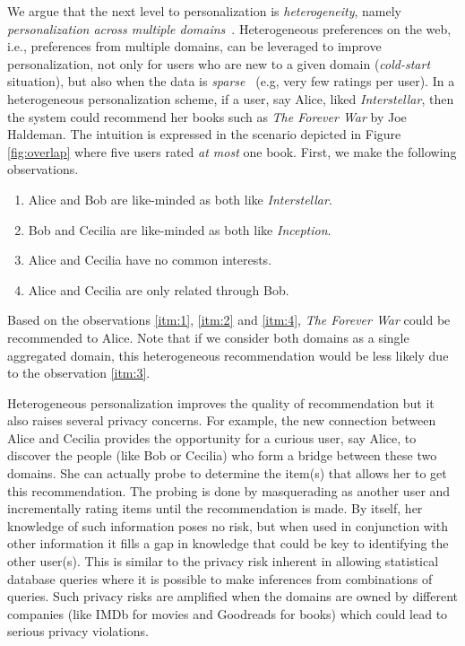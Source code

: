 We argue that the next level to personalization is \emph{heterogeneity}, namely \emph{personalization across multiple domains}~\cite{cremonesi2011cross}. Heterogeneous preferences on the web, i.e., preferences from multiple domains, can be leveraged to improve personalization, not only for users who are new to a given domain (\emph{cold-start} situation), but also when the data is \emph{sparse}~\cite{adomavicius2005toward} (e.g, very few ratings per user). In a heterogeneous personalization scheme, if a user, say Alice, liked \emph{Interstellar}, then the system could recommend her books such as \emph{The Forever War} by Joe Haldeman. The intuition is expressed in the scenario depicted in Figure \ref{fig:overlap} where five users rated \emph{at most} one book. First, we make the following observations.
\begin{enumerate}[label=\textnormal{(\arabic*)}]
\item Alice and Bob are like-minded as both like \emph{Interstellar}\label{itm:1}.
\item Bob and Cecilia are like-minded as both like \emph{Inception}\label{itm:2}.
\item Alice and Cecilia have no common interests\label{itm:3}.
\item Alice and Cecilia are only related through Bob\label{itm:4}.
\end{enumerate}

Based on the observations \ref{itm:1}, \ref{itm:2} and \ref{itm:4}, \emph{The Forever War} could be recommended to Alice. Note that if we consider both domains as a single aggregated domain, this heterogeneous recommendation would be less likely due to the observation \ref{itm:3}.

 Heterogeneous personalization improves the quality of recommendation but it also raises several privacy concerns. For example, the new connection between Alice and Cecilia provides the opportunity for a curious user, say Alice, to discover the people (like Bob or Cecilia) who form a bridge between these two domains. She can actually probe to determine the item(s) that allows her to get this recommendation. The probing is done by masquerading as another user and incrementally rating items until the recommendation is made. By itself, her knowledge of such information poses no risk, but when used in conjunction with other information it fills a gap in knowledge that could be key to identifying the other user(s). This is similar to the privacy risk inherent in allowing statistical database queries where it is possible to make inferences from combinations of queries. Such privacy risks are amplified when the domains are owned by different companies (like IMDb for movies and Goodreads for books) which could lead to serious privacy violations.


